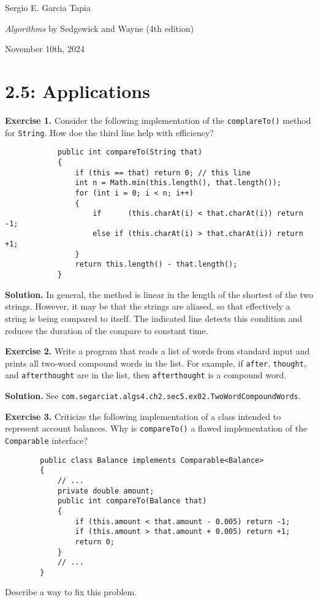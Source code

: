 \documentclass[12pt, a4paper]{article}
\newenvironment{ex}[2][Exercise]
{\par\medskip\noindent \textbf{#1 #2.}}
{\medskip}
\newenvironment{sol}[1][Solution]
{\par\medskip\noindent \textbf{#1.} }
{\medskip}
\begin{document}
	\noindent Sergio E. Garcia Tapia \hfill
	
	\noindent \emph{Algorithms} by Sedgewick and Wayne (4th edition) \cite{sedgewick_wayne}\hfill
	
	\noindent November 10th, 2024\hfill 
	\section*{2.5: Applications}
	\begin{ex}{1}
		Consider the following implementation of the \texttt{complareTo()} method for
		\texttt{String}. How doe the third line help with efficiency?
		\begin{lstlisting}
			public int compareTo(String that)
			{
				if (this == that) return 0; // this line
				int n = Math.min(this.length(), that.length());
				for (int i = 0; i < n; i++)
				{
					if      (this.charAt(i) < that.charAt(i)) return -1;
					else if (this.charAt(i) > that.charAt(i)) return +1;
				}
				return this.length() - that.length();
			}
		\end{lstlisting}
	\end{ex}
	\begin{sol}
		In general, the method is linear in the length of the shortest of the two
		strings. However, it may be that the strings are aliased, so that effectively
		a string is being compared to itself. The indicated line detects this condition
		and reduces the duration of the compare to constant time.
	\end{sol}
	\begin{ex}{2}
		Write a program  that reads a list of words from standard input and prints
		all two-word compound words in the list. For example, if \texttt{after},
		\texttt{thought}, and \texttt{afterthought} are in the list, then
		\texttt{afterthought} is a compound word.
	\end{ex}
	\begin{sol}
		See \texttt{com.segarciat.algs4.ch2.sec5.ex02.TwoWordCompoundWords}.
	\end{sol}
	\begin{ex}{3}
		Criticize the following implementation of a class intended to represent
		account balances. Why is \texttt{compareTo()} a flawed implementation
		of the \texttt{Comparable} interface?
		\begin{lstlisting}
		public class Balance implements Comparable<Balance>
		{
			// ...
			private double amount;
			public int compareTo(Balance that)
			{
				if (this.amount < that.amount - 0.005) return -1;
				if (this.amount > that.amount + 0.005) return +1;
				return 0;
			}
			// ...
		}
		\end{lstlisting}
		Describe a way to fix this problem.
	\end{ex}
\end{document}
